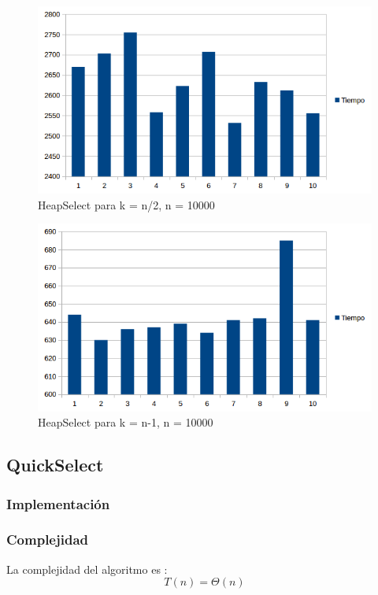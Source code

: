 \begin{figure}[H]
\centering
\includegraphics[width=\textwidth]{KN2/HeapSelectN2.png}
\caption{HeapSelect para k = n/2, n = 10000}
\end{figure}

\begin{figure}[H]
\centering
\includegraphics[width=\textwidth]{KN/HeapSelectN.png}
\caption{HeapSelect para k = n-1, n = 10000}
\end{figure}


\newpage

\subsection{QuickSelect}
\subsubsection{Implementación}

\subsubsection{Complejidad}
La complejidad del algoritmo es \cite{CORMEN_QUICKSELECT}:
$$ T(n) = \Theta(n) $$
